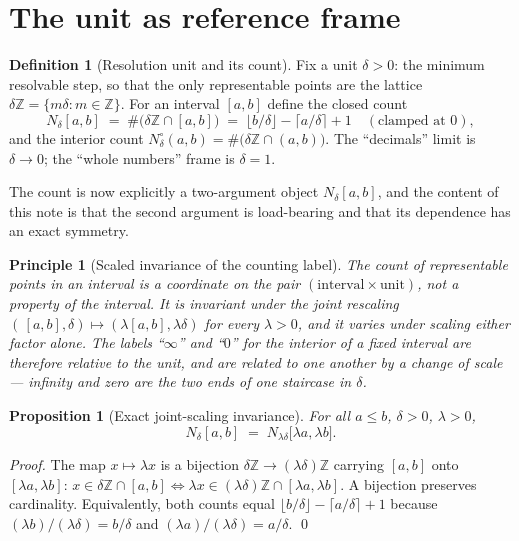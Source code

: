 \documentclass[11pt]{article}
\theoremstyle{definition}
\newtheorem{definition}{Definition}
\theoremstyle{plain}
\newtheorem{principle}{Principle}
\newtheorem{proposition}{Proposition}
\newcommand{\Z}{\mathbb{Z}}
\begin{document}
\section{The unit as reference frame}\label{sec:frame}

\begin{definition}[Resolution unit and its count]\label{def:count}
Fix a unit $\delta>0$: the minimum resolvable step, so that the only representable points are the
lattice $\delta\Z=\{m\delta : m\in\Z\}$. For an interval $[a,b]$ define the closed count
\[
  N_\delta[a,b]\;=\;\#\big(\delta\Z\cap[a,b]\big)\;=\;\big\lfloor b/\delta\big\rfloor-\big\lceil a/\delta\big\rceil+1
  \quad(\text{clamped at }0),
\]
and the interior count $N_\delta^{\circ}(a,b)=\#\big(\delta\Z\cap(a,b)\big)$. The ``decimals'' limit is
$\delta\to 0$; the ``whole numbers'' frame is $\delta=1$.
\end{definition}

The count is now explicitly a two-argument object $N_\delta[a,b]$, and the content of this note is
that the second argument is load-bearing and that its dependence has an exact symmetry.

\begin{principle}[Scaled invariance of the counting label]\label{prin:scaled}
The count of representable points in an interval is a coordinate on the pair
$(\text{interval}\times\text{unit})$, not a property of the interval. It is \emph{invariant} under the
joint rescaling $(\,[a,b],\delta)\mapsto(\lambda[a,b],\lambda\delta)$ for every $\lambda>0$, and it
\emph{varies} under scaling either factor alone. The labels ``$\infty$'' and ``$0$'' for the interior
of a fixed interval are therefore relative to the unit, and are related to one another by a change of
scale --- infinity and zero are the two ends of one staircase in $\delta$.
\end{principle}

\begin{proposition}[Exact joint-scaling invariance]\label{prop:invariance}
For all $a\le b$, $\delta>0$, $\lambda>0$,
\[
  N_\delta[a,b]\;=\;N_{\lambda\delta}\big[\lambda a,\lambda b\big].
\]
\end{proposition}
\begin{proof}
The map $x\mapsto\lambda x$ is a bijection $\delta\Z\to(\lambda\delta)\Z$ carrying $[a,b]$ onto
$[\lambda a,\lambda b]$: $x\in\delta\Z\cap[a,b]\iff \lambda x\in(\lambda\delta)\Z\cap[\lambda a,\lambda b]$.
A bijection preserves cardinality. Equivalently, both counts equal
$\lfloor b/\delta\rfloor-\lceil a/\delta\rceil+1$ because $(\lambda b)/(\lambda\delta)=b/\delta$ and
$(\lambda a)/(\lambda\delta)=a/\delta$. \qed
\end{proof}
\end{document}
